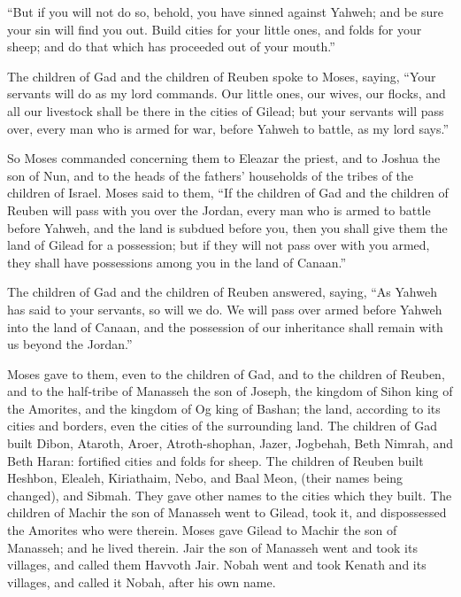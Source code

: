 ``But if you will not do so, behold, you have sinned
against Yahweh; and be sure your sin will find you out. 
Build cities for your little ones, and folds for your sheep; and do that
which has proceeded out of your mouth.''

 The children of Gad and the children of Reuben spoke to
Moses, saying, ``Your servants will do as my lord commands.
 Our little ones, our wives, our flocks, and all our
livestock shall be there in the cities of Gilead;  but your
servants will pass over, every man who is armed for war, before Yahweh
to battle, as my lord says.''

 So Moses commanded concerning them to Eleazar the priest,
and to Joshua the son of Nun, and to the heads of the fathers'
households of the tribes of the children of Israel.  Moses
said to them, ``If the children of Gad and the children of Reuben will
pass with you over the Jordan, every man who is armed to battle before
Yahweh, and the land is subdued before you, then you shall give them the
land of Gilead for a possession;  but if they will not pass
over with you armed, they shall have possessions among you in the land
of Canaan.''

 The children of Gad and the children of Reuben answered,
saying, ``As Yahweh has said to your servants, so will we do.
 We will pass over armed before Yahweh into the land of
Canaan, and the possession of our inheritance shall remain with us
beyond the Jordan.''

 Moses gave to them, even to the children of Gad, and to
the children of Reuben, and to the half-tribe of Manasseh the son of
Joseph, the kingdom of Sihon king of the Amorites, and the kingdom of Og
king of Bashan; the land, according to its cities and borders, even the
cities of the surrounding land.  The children of Gad built
Dibon, Ataroth, Aroer,  Atroth-shophan, Jazer, Jogbehah,
 Beth Nimrah, and Beth Haran: fortified cities and folds
for sheep.  The children of Reuben built Heshbon, Elealeh,
Kiriathaim,  Nebo, and Baal Meon, (their names being
changed), and Sibmah. They gave other names to the cities which they
built.  The children of Machir the son of Manasseh went to
Gilead, took it, and dispossessed the Amorites who were therein.
 Moses gave Gilead to Machir the son of Manasseh; and he
lived therein.  Jair the son of Manasseh went and took its
villages, and called them Havvoth Jair.  Nobah went and
took Kenath and its villages, and called it Nobah, after his own name.

